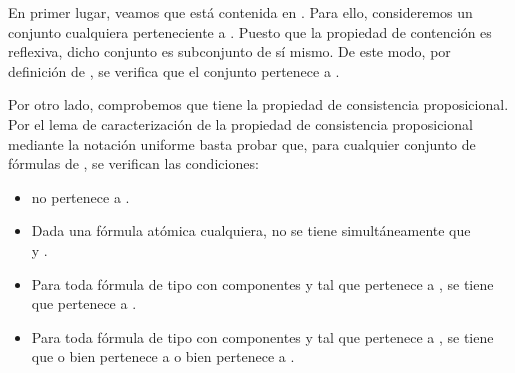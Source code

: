 \begin{isabellebody}
\begin{isamarkuptext}
\begin{demostracion}
  En primer lugar, veamos que  está contenida en . Para ello, consideremos un conjunto
  cualquiera perteneciente a . Puesto que la propiedad de contención es reflexiva, dicho conjunto 
  es subconjunto de sí mismo. De este modo, por definición de , se verifica que el conjunto 
  pertenece a .

  Por otro lado, comprobemos que  tiene la propiedad de consistencia proposicional.
  Por el lema de caracterización de la propiedad de consistencia proposicional mediante la
  notación uniforme basta probar que, para cualquier conjunto de fórmulas  de , se 
  verifican las condiciones:
  \begin{itemize}
    \item \isa{{\isasymbottom}} no pertenece a .
    \item Dada  una fórmula atómica cualquiera, no se tiene 
    simultáneamente que\\  y .
    \item Para toda fórmula de tipo \isa{{\isasymalpha}} con componentes  y  tal que \isa{{\isasymalpha}}
    pertenece a , se tiene que  pertenece a .
    \item Para toda fórmula de tipo \isa{{\isasymbeta}} con componentes  y  tal que \isa{{\isasymbeta}}
    pertenece a , se tiene que o bien  pertenece a  o 
    bien  pertenece a .
  \end{itemize} 


\end{demostracion}
\end{isamarkuptext}
\end{isabellebody}
